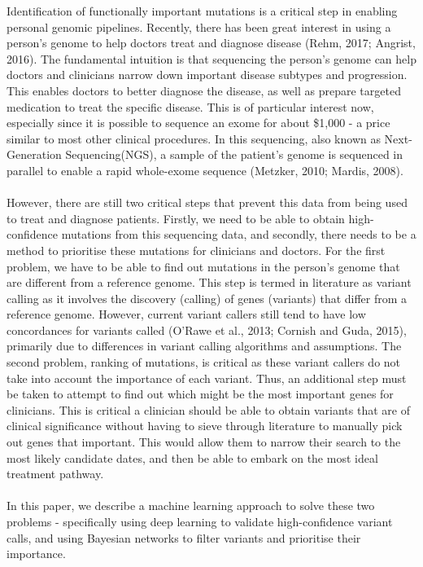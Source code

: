 \documentclass{article}
\begin{document}
Identification of functionally important mutations is a critical step in enabling personal genomic pipelines. Recently, there has been great interest in using a person's genome to help doctors treat and diagnose disease (Rehm, 2017; Angrist, 2016). The fundamental intuition is that sequencing the person's genome can help doctors and clinicians narrow down important disease subtypes and progression. This enables doctors to better diagnose the disease, as well as prepare targeted medication to treat the specific disease. This is of particular interest now, especially since it is possible to sequence an exome for about \$1,000 - a price similar to most other clinical procedures. In this sequencing, also known as Next-Generation Sequencing(NGS), a sample of the patient's genome is sequenced in parallel to enable a rapid whole-exome sequence (Metzker, 2010; Mardis, 2008). \\\\
However, there are still two critical steps that prevent this data from being used to treat and diagnose patients. Firstly, we need to be able to obtain high-confidence mutations from this sequencing data, and secondly, there needs to be a method to prioritise these mutations for clinicians and doctors. For the first problem, we have to be able to find out mutations in the person's genome that are different from a reference genome. This step is termed in literature as variant calling as it involves the discovery (calling) of genes (variants) that differ from a reference genome. However, current variant callers still tend to have low concordances for variants called (O'Rawe et al., 2013; Cornish and Guda, 2015), primarily due to differences in variant calling algorithms and assumptions. The second problem, ranking of mutations, is critical as these variant callers do not take into account the importance of each variant. Thus, an additional step must be taken to attempt to find out which might be the most important genes for clinicians. This is critical a clinician should be able to obtain variants that are of clinical significance without having to sieve through literature to manually pick out genes that important. This would allow them to narrow their search to the most likely candidate dates, and then be able to embark on the most ideal treatment pathway. \\\\
In this paper, we describe a machine learning approach to solve these two problems - specifically using deep learning to validate high-confidence variant calls, and using Bayesian networks to filter variants and prioritise their importance. \\
\end{document}
